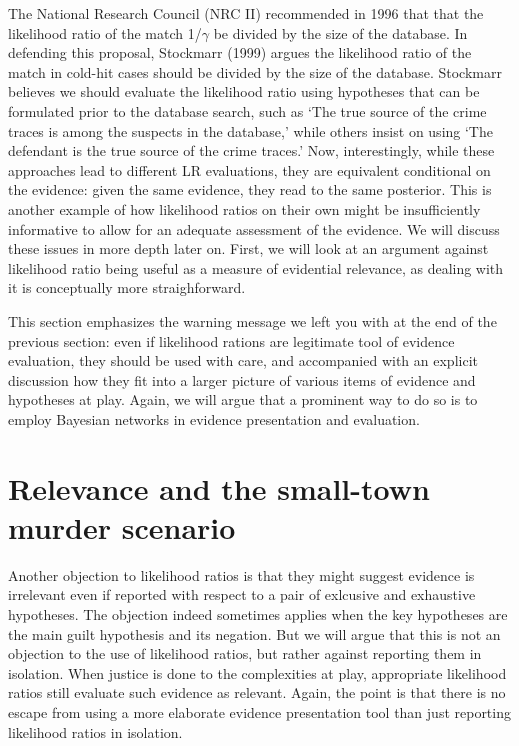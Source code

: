 \documentclass[
  10pt,
  dvipsnames,enabledeprecatedfontcommands]{scrartcl}
\newcommand{\mar}[1]{\todo[color=blue!40]{#1}}
\begin{document}
The National Research Council (NRC II) recommended in 1996 that that the
likelihood ratio of the match 1/\(\gamma\) be divided by the size of the
database. In defending this proposal, Stockmarr (1999) argues the
likelihood ratio of the match in cold-hit cases should be divided by the
size of the database. Stockmarr believes we should evaluate the
likelihood ratio using hypotheses that can be formulated prior to the
database search, such as `The true source of the crime traces is among
the suspects in the database,' while others insist on using `The
defendant is the true source of the crime traces.' Now, interestingly,
while these approaches lead to different LR evaluations, they are
equivalent conditional on the evidence: given the same evidence, they
read to the same posterior. This is another example of how likelihood
ratios on their own might be insufficiently informative to allow for an
adequate assessment of the evidence. We will discuss these issues in
more depth later on. First, we will look at an argument against
likelihood ratio being useful as a measure of evidential relevance, as
dealing with it is conceptually more straighforward.

\mar{added this summary passage}

This section emphasizes the warning message we left you with at the end
of the previous section: even if likelihood rations are legitimate tool
of evidence evaluation, they should be used with care, and accompanied
with an explicit discussion how they fit into a larger picture of
various items of evidence and hypotheses at play. Again, we will argue
that a prominent way to do so is to employ Bayesian networks in evidence
presentation and evaluation.

\hypertarget{relevance-and-the-small-town-murder-scenario}{%
\section{\texorpdfstring{Relevance and the small-town murder scenario
\label{sec:relevance}}{Relevance and the small-town murder scenario }}\label{relevance-and-the-small-town-murder-scenario}}

\mar{added this intro, check}

Another objection to likelihood ratios is that they might suggest
evidence is irrelevant even if reported with respect to a pair of
exlcusive and exhaustive hypotheses. The objection indeed sometimes
applies when the key hypotheses are the main guilt hypothesis and its
negation. But we will argue that this is not an objection to the use of
likelihood ratios, but rather against reporting them in isolation. When
justice is done to the complexities at play, appropriate likelihood
ratios still evaluate such evidence as relevant. Again, the point is
that there is no escape from using a more elaborate evidence
presentation tool than just reporting likelihood ratios in isolation.
\end{document}

